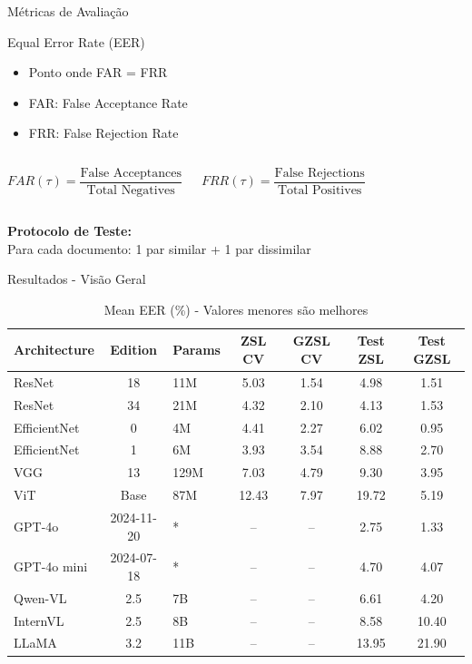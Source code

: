 \begin{frame}{Métricas de Avaliação}
\begin{block}{Equal Error Rate (EER)}
\begin{itemize}
    \item Ponto onde FAR = FRR
    \item FAR: False Acceptance Rate
    \item FRR: False Rejection Rate
\end{itemize}
\end{block}

\begin{columns}
\begin{equation*}
FAR(\tau) = \frac{\text{False Acceptances}}{\text{Total Negatives}}
\end{equation*}

\begin{equation*}
FRR(\tau) = \frac{\text{False Rejections}}{\text{Total Positives}}
\end{equation*}
\end{columns}

\vspace{0.3cm}
\begin{center}
\textbf{Protocolo de Teste:}\\
Para cada documento: 1 par similar + 1 par dissimilar
\end{center}
\end{frame}

\begin{frame}{Resultados - Visão Geral}
\begin{table}
\tiny
\begin{tabular}{lclcccc}
\toprule
\textbf{Architecture} & \textbf{Edition} & \textbf{Params} & \textbf{ZSL CV} & \textbf{GZSL CV} & \textbf{Test ZSL} & \textbf{Test GZSL} \\
\midrule
ResNet & 18 & 11M & 5.03 & 1.54 & 4.98 & 1.51 \\
ResNet & 34 & 21M & 4.32 & 2.10 & 4.13 & 1.53 \\
EfficientNet & 0 & 4M & 4.41 & 2.27 & 6.02 & 0.95 \\
EfficientNet & 1 & 6M & 3.93 & 3.54 & 8.88 & 2.70 \\
VGG & 13 & 129M & 7.03 & 4.79 & 9.30 & 3.95 \\
ViT & Base & 87M & 12.43 & 7.97 & 19.72 & 5.19 \\
\midrule
GPT-4o & 2024-11-20 & * & -- & -- & 2.75 & 1.33 \\
GPT-4o mini & 2024-07-18 & * & -- & -- & 4.70 & 4.07 \\
Qwen-VL & 2.5 & 7B & -- & -- & 6.61 & 4.20 \\
InternVL & 2.5 & 8B & -- & -- & 8.58 & 10.40 \\
LLaMA & 3.2 & 11B & -- & -- & 13.95 & 21.90 \\
\bottomrule
\end{tabular}
\caption*{Mean EER (\%) - Valores menores são melhores}
\end{table}
\end{frame}

